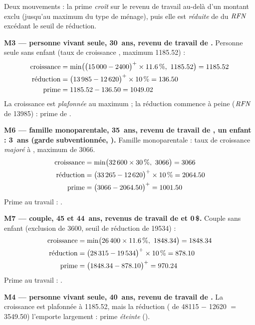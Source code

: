 \pexemples Deux mouvements : la prime \emph{croît} sur le revenu de travail au-delà
d'un montant exclu (jusqu'au maximum du type de ménage), puis elle est
\emph{réduite} de  du $\mathit{RFN}$ excédant le seuil de
réduction.

\medskip\noindent\textbf{M3 --- personne vivant seule, 30~ans, revenu de travail de .}
Personne seule sans enfant (taux de croissance ,
maximum \num{1185.52}) :
\begin{align*}
\text{croissance} &= \min\bigl(\bigl(\num{15000} - \num{2400}\bigr)^{+} \times \num{11.6}\,\%,\ \num{1185.52}\bigr) = \num{1185.52} \\
\text{réduction} &= \bigl(\num{13985} - \num{12620}\bigr)^{+} \times \num{10}\,\% = \num{136.50} \\
\text{prime} &= \num{1185.52} - \num{136.50} = \num{1049.02}
\end{align*}
La croissance est \emph{plafonnée} au maximum ; la réduction commence à
peine ($\mathit{RFN}$ de \num{13985}) : prime de .

\medskip\noindent\textbf{M6 --- famille monoparentale, 35~ans, revenu de travail de , un enfant : 3~ans (garde subventionnée, ).}
Famille monoparentale : taux de croissance \emph{majoré} à
, maximum de \num{3066}.
\begin{align*}
\text{croissance} &= \min\bigl(\num{32600} \times \pc{30},\ \num{3066}\bigr) = \num{3066} \\
\text{réduction} &= \pos{\num{33265} - \num{12620}} \times \pc{10} = \num{2064.50} \\
\text{prime} &= \pos{\num{3066} - \num{2064.50}} = \num{1001.50}
\end{align*}
Prime au travail : .

\medskip\noindent\textbf{M7 --- couple, 45 et 44~ans, revenus de travail de  et 0\,\$.}
Couple sans enfant (exclusion de \num{3600},
seuil de réduction de \num{19534}) :
\begin{align*}
\text{croissance} &= \min\bigl(\num{26400} \times \pc{11.6},\ \num{1848.34}\bigr) = \num{1848.34} \\
\text{réduction} &= \pos{\num{28315} - \num{19534}} \times \pc{10} = \num{878.10} \\
\text{prime} &= \pos{\num{1848.34} - \num{878.10}} = \num{970.24}
\end{align*}
Prime au travail : .

\medskip\noindent\textbf{M4 --- personne vivant seule, 40~ans, revenu de travail de .}
La croissance est plafonnée à \num{1185.52}, mais la réduction
( de \num{48115} $-$ \num{12620} $=$
\num{3549.50}) l'emporte largement : prime \emph{éteinte} ().
